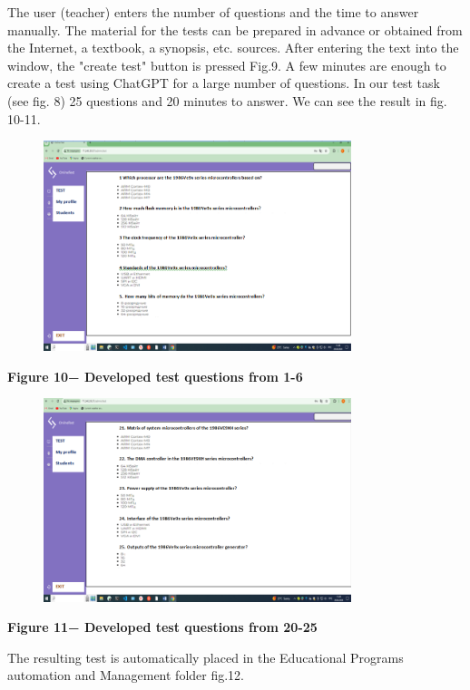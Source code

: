 The user (teacher) enters the number of questions and the time to answer
manually. The material for the tests can be prepared in advance or
obtained from the Internet, a textbook, a synopsis, etc. sources. After
entering the text into the window, the "create test" button is pressed
Fig.9. A few minutes are enough to create a test using ChatGPT for a
large number of questions. In our test task (see fig. 8) 25 questions
and 20 minutes to answer. We can see the result in fig. 10-11.

\begin{figure}[H]
	\centering
	\includegraphics[width=0.8\textwidth]{assets/135}
	\caption*{}
\end{figure}

{\bfseries Figure 10− Developed test questions from 1-6}

\begin{figure}[H]
	\centering
	\includegraphics[width=0.8\textwidth]{assets/136}
	\caption*{}
\end{figure}

{\bfseries Figure 11− Developed test questions from 20-25}

The resulting test is automatically placed in the Educational Programs
automation and Management folder fig.12.

